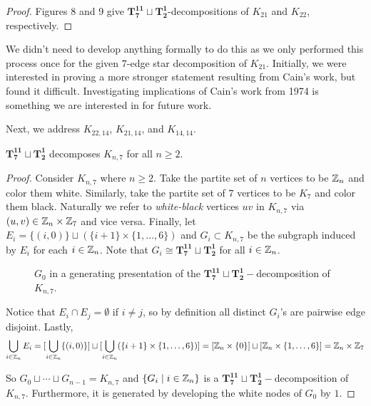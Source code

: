 \begin{proof}
     Figures 8 and 9 give $\mathbf{T_{7}^{11}}\sqcup\mathbf{T_{2}^{1}}$-decompositions of $K_{21}$ and $K_{22}$, respectively.%
\end{proof}
We didn't need to develop anything formally to do this as we only performed this process once for the given $7$-edge star decomposition of $K_{21}$. Initially, we were interested in proving a more stronger statement resulting from Cain's work, but found it difficult. Investigating implications of Cain's work \cite{bib:Cain} from 1974 is something we are interested in for future work.

Next, we address $K_{22,14}$, $K_{21,14}$, and $K_{14,14}$. 
\newpage
\begin{thm} \label{thm:K_n,7}
    $\mathbf{T_{7}^{11}}\sqcup\mathbf{T_{2}^{1}}$ decomposes $K_{n,7}$ for all $n\geq 2$.
\end{thm}

\begin{proof}
    Consider $K_{n,7}$ where $n\geq 2$. Take the partite set of $n$ vertices to be $\mathbb{Z}_{n}$ and color them white. Similarly, take the partite set of $7$ vertices to be $K_{7}$ and color them black. Naturally we refer to \textit{white-black} vertices $uv$ in $K_{n,7}$ via $(u,v)\in \mathbb{Z}_{n}\times\mathbb{Z}_{7}$ and vice versa. Finally, let $E_{i}=\{(i,0)\}\sqcup (\{i+1\}\times \{1,\hdots,6\})$ and $G_{i}\subset K_{n,7}$ be the subgraph induced by $E_{i}$ for each $i\in \mathbb{Z}_{n}$. Note that $G_{i}\cong \mathbf{T_{7}^{11}}\sqcup\mathbf{T_{2}^{1}}$ for all $i\in \mathbb{Z}_{n}$.

    \begin{figure}[H]
        \centering
        
        \caption{$G_{0}$ in a generating presentation of the $\mathbf{T_{7}^{11}}\sqcup\mathbf{T_{2}^{1}}-$decomposition of $K_{n,7}$.}
        \label{fig:enter-label}
    \end{figure}

    \noindent Notice that $E_{i}\cap E_{j}=\emptyset$ if $i\neq j$, so by definition all distinct $G_{i}$'s are pairwise edge disjoint. Lastly,
    $$\bigcup_{i\in \mathbb{Z}_{n}} E_{i}=[\bigcup_{i\in \mathbb{Z}_{n}} \{(i,0)\}]\sqcup [\bigcup_{i\in \mathbb{Z}_{n}} (\{i+1\}\times \{1,\hdots, 6\})]=[\mathbb{Z}_{n}\times \{0\}]\sqcup [\mathbb{Z}_{n}\times \{1,\hdots, 6\}]=\mathbb{Z}_{n}\times \mathbb{Z}_{7}$$
    
    \noindent So $G_{0}\sqcup \cdots \sqcup G_{n-1}=K_{n,7}$ and $\{G_{i}\mid i\in \mathbb{Z}_{n}\}$ is a $\mathbf{T_{7}^{11}}\sqcup\mathbf{T_{2}^{1}}-$decomposition of $K_{n,7}$. Furthermore, it is generated by developing the white nodes of $G_{0}$ by $1$.
\end{proof}

